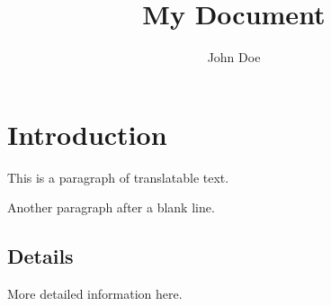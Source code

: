 \documentclass{article}
\title{My Document}
\author{John Doe}
\begin{document}
\section{Introduction}
This is a paragraph of translatable text.

Another paragraph after a blank line.

\subsection{Details}
More detailed information here.
\end{document}
